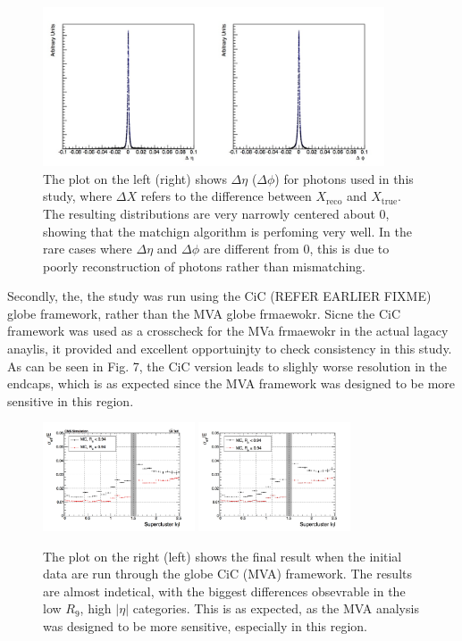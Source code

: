 \documentclass[10pt]{article}
\begin{document}
\begin{figure}[h!]

  \centering
\includegraphics[width=0.9\textwidth]{"Delta"}
\caption{ The plot on the left (right) shows $\Delta \eta$ ($\Delta \phi$) for photons used in this study, where $\Delta X$ refers to the difference between $X_{\text{reco}}$ and $X_{\text{true}}$. The resulting distributions are very narrowly centered about 0, showing that the matchign algorithm is perfoming very well. In the rare cases where $\Delta \eta$ and $\Delta \phi$ are different from 0, this is due to poorly reconstruction of photons rather than mismatching.   }
\end{figure}
Secondly, the, the study was run using the CiC (REFER EARLIER FIXME) globe framework, rather than the MVA globe frmaewokr. Sicne the CiC framework was used as a crosscheck for the MVa frmaewokr in the actual lagacy anaylis, it provided and excellent opportuinjty to check consistency in this study. As can be seen in Fig. 7, the CiC version leads to slighly worse resolution in the endcaps, which is as expected since the MVA framework was designed to be more sensitive in this region.

\begin{figure}[h!]

  \centering
\includegraphics[width=0.4\textwidth]{"EffSigma_vs_eta_mva"}
\includegraphics[width=0.4\textwidth]{"EffSigma_vs_eta_cic"}
\caption{The plot on the right (left) shows the final result when the initial data are run through the globe CiC (MVA) framework. The results are almost indetical, with the biggest differences obsevrable in the low $R_9$, high $|\eta|$ categories. This is as expected, as the MVA analysis was designed to be more sensitive, especially in this region.}
\end{figure}
\end{document}
